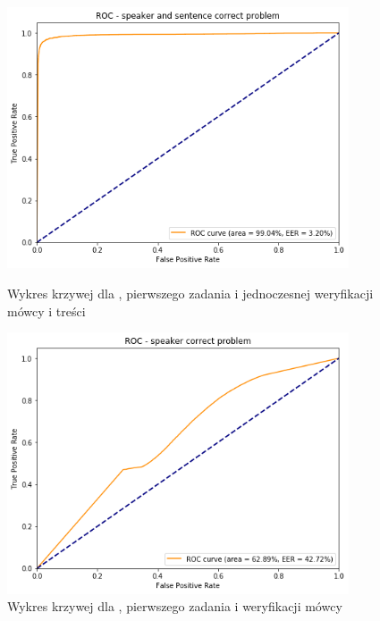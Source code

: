 \begin{figure}[H]
    \centering
    \begin{minipage}{.5\textwidth}
        \centering
        \includegraphics[width=0.9\textwidth]{images/4_3_gmm_roc_both}
        \caption{Wykres krzywej  dla , pierwszego zadania  i jednoczesnej weryfikacji mówcy i treści}
        \label{fig:4_3_gmm_roc_both}
    \end{minipage}%
    \begin{minipage}{.5\textwidth}
        \centering
        \includegraphics[width=0.9\textwidth]{images/4_3_dnn_roc_speaker}
        \caption{Wykres krzywej  dla , pierwszego zadania  i weryfikacji mówcy}
        \label{fig:4_3_dnn_roc_speaker}
    \end{minipage}
\end{figure}

